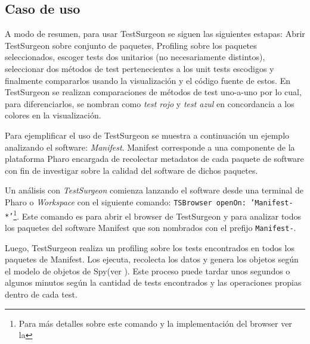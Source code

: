 \subsection{Caso de uso}
\par A modo de resumen, para usar TestSurgeon se siguen las siguientes estapas: Abrir TestSurgeon sobre conjunto de paquetes, Profiling sobre los paquetes seleccionados, escoger tests dos unitarios (no necesariamente distintos), seleccionar dos métodos de test pertenecientes a los unit tests escodigos y finalmente compararlos usando la visualización y el código fuente de estos. En TestSurgeon se realizan comparaciones de métodos de test uno-a-uno por lo cual, para diferenciarlos, se nombran como \emph{test rojo} y \emph{test azul} en concordancia a los colores en la visualización.

\par Para ejemplificar el uso de TestSurgeon se muestra a continuación un ejemplo analizando el software: \emph{Manifest}. Manifest corresponde a una componente de la plataforma Pharo encargada de recolectar metadatos de cada paquete de software con fin de investigar sobre la calidad del software de dichos paquetes.

\par Un análisis con \emph{TestSurgeon} comienza lanzando el software desde una terminal de Pharo o \emph{Workspace} con el siguiente comando: {\tt TSBrowser openOn: 'Manifest-*'}\footnote{Para más detalles sobre este comando y la implementación del browser ver la  }. Este comando es para abrir el browser de TestSurgeon y para analizar todos los paquetes del software Manifest que son nombrados con el prefijo {\tt Manifest-}.


\par Luego, TestSurgeon realiza un profiling sobre los tests encontrados en todos los paquetes de Manifest. Los ejecuta, recolecta los datos y genera los objetos según el modelo de objetos de Spy(ver ). Este proceso puede tardar unos segundos o algunos minutos según la cantidad de tests encontrados y las operaciones propias dentro de cada test.


